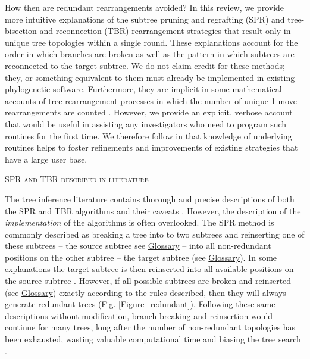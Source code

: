 \documentclass[12pt,letterpaper]{article}
\renewcommand{\section}[1]{%
\bigskip
\begin{center}
\begin{Large}
\normalfont\scshape #1
\medskip
\end{Large}
\end{center}}
\begin{document}
How then are redundant rearrangements avoided?
In this review, we provide more intuitive explanations of the subtree pruning and regrafting (SPR) and tree-bisection and reconnection (TBR) rearrangement strategies that result only in unique tree topologies within a single round.
These explanations account for the order in which branches are broken as well as the pattern in which subtrees are reconnected to the target subtree.
We do not claim credit for these methods; they, or something equivalent to them must already be implemented in existing phylogenetic software.
Furthermore, they are implicit in some mathematical accounts of tree rearrangement processes in which the number of unique 1-move rearrangements are counted \citep{allen2001subtree}.
However, we provide an explicit, verbose account that would be useful in assisting any investigators who need to program such routines for the first time. 
We therefore follow \citet{goloboff1993character} in that knowledge of underlying routines helps to foster refinements and improvements of existing strategies that have a large user base.

\section{SPR and TBR described in literature}
The tree inference literature contains thorough and precise descriptions of both the SPR and TBR algorithms \citep[e.g.][]{allen2001subtree,felsenstein2004inferring} and their caveats \citep[i.e speed and reliability - e.g.][]{morrison2007increasing,lakner2008efficiency,goloboff2014bias}.
However, the description of the \textit{implementation} of the algorithms is often overlooked.
The SPR method is commonly described as breaking a tree into to two subtrees and reinserting one of these subtrees -- the source subtree see \hyperref[Glossary]{Glossary} -- into all non-redundant positions on the other subtree -- the target subtree (see \hyperref[Glossary]{Glossary}).
In some explanations the target subtree is then reinserted into all available positions on the source subtree \citep[e.g.][Fig. 8.5]{swofford2003phylogeny}.
However, if all possible subtrees are broken and reinserted (see \hyperref[Glossary]{Glossary}) exactly according to the rules described, then they will always generate redundant trees (Fig. \ref{Figure_redundant}). 
Following these same descriptions without modification, branch breaking and reinsertion would continue for many trees, long after the number of non-redundant topologies has been exhausted, wasting valuable computational time and biasing the tree search \citep{goloboff2014bias}.
\end{document}
